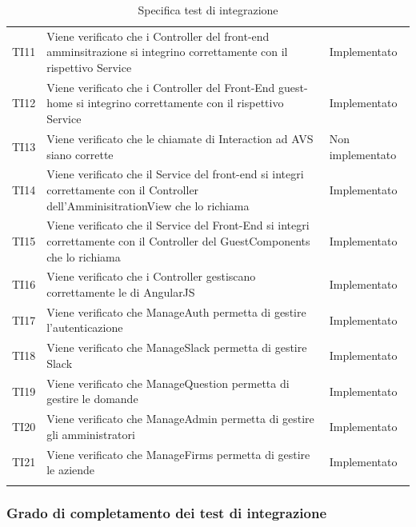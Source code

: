 \documentclass[../PianoDiQualifica_v4.0.0.tex]{subfiles}
\begin{document}
\begin{longtable}[c] { >{\centering\arraybackslash}p{4cm} p{7cm} >{\centering\arraybackslash}p{4cm}}
			\midrule
			\addlinespace[0.3em]
			TI11 & Viene verificato che i Controller del front-end amminsitrazione si integrino correttamente con il rispettivo Service & Implementato \\
			\addlinespace[0.3em]
			\midrule
			\addlinespace[0.3em]
			TI12 & Viene verificato che i Controller del Front-End guest-home si integrino correttamente con il rispettivo Service & Implementato \\
			\addlinespace[0.3em]
			\midrule
			\addlinespace[0.3em]
			TI13 & Viene verificato che le chiamate di Interaction ad AVS siano corrette & Non implementato \\
			\addlinespace[0.3em]
			\midrule
			\addlinespace[0.3em]
			TI14 & Viene verificato che il Service del front-end si integri correttamente con il Controller dell'AmminisitrationView che lo richiama & Implementato \\
			\addlinespace[0.3em]
			\midrule
			\addlinespace[0.3em]
			TI15 & Viene verificato che il Service del Front-End si integri correttamente con il Controller del GuestComponents che lo richiama & Implementato \\
			\addlinespace[0.3em]
			\midrule
			\addlinespace[0.3em]
			TI16 & Viene verificato che i Controller gestiscano correttamente le \gl{root} di AngularJS & Implementato \\
			\addlinespace[0.3em]
			\midrule
			\addlinespace[0.3em]
			TI17 & Viene verificato che ManageAuth permetta di gestire l'autenticazione & Implementato \\
			\addlinespace[0.3em]
			\midrule
			\addlinespace[0.3em]
			TI18 & Viene verificato che ManageSlack permetta di gestire Slack & Implementato \\
			\addlinespace[0.3em]
			\midrule
			\addlinespace[0.3em]
			TI19 & Viene verificato che ManageQuestion permetta di gestire le domande & Implementato \\
			\addlinespace[0.3em]
			\midrule
			\addlinespace[0.3em]
			TI20 & Viene verificato che ManageAdmin permetta di gestire gli amministratori & Implementato \\
			\addlinespace[0.3em]
			\midrule
			\addlinespace[0.3em]
			TI21 & Viene verificato che ManageFirms permetta di gestire le aziende & Implementato \\
			\bottomrule
			\caption{Specifica test di integrazione}
	\end{longtable}

		\vspace*{1cm}
		\subsubsection{Grado di completamento dei test di integrazione}
\end{document}
